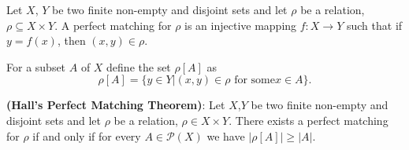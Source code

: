 \documentclass[../main.tex]{subfiles}
\begin{document}
\begin{purple}
\begin{definition}

Let $X$, $Y$ be two finite non-empty and disjoint sets and let $\rho$ be a relation, $\rho\subseteq X\times Y$. A perfect matching for $\rho$ is an injective mapping $f:X\rightarrow Y$ such that if $y=f(x)$, then $(x,y)\in \rho$.

For a subset $A$ of $X$ define the set $\rho[A]$ as 
$$
\rho[A]=\{y\in Y|(x,y)\in\rho\text{ for some} x\in A\}.
$$
\end{definition}
\end{purple}

\begin{yellow}
\begin{theorem}

\textbf{(Hall's Perfect Matching Theorem)}: Let $X$,$Y$ be two finite non-empty and disjoint sets and let $\rho$ be a relation, $\rho\in X\times Y$. There exists a perfect matching for $\rho$ if and only if for every $A\in \mathcal{P}(X)$ we have $|\rho[A]|\ge|A|$. 
\end{theorem}
\end{yellow}
\end{document}
